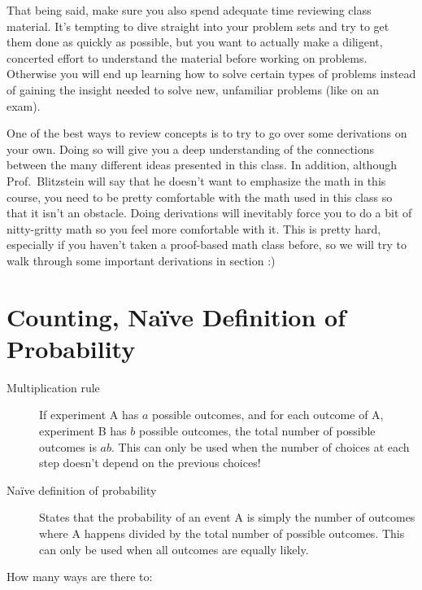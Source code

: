 \documentclass{article}
\begin{document}
That being said, make sure you also spend adequate time reviewing class material. It's tempting to dive straight into your problem sets and try to get them done as quickly as possible, but you want to actually make a diligent, concerted effort to understand the material before working on problems. Otherwise you will end up learning how to solve certain types of problems instead of gaining the insight needed to solve new, unfamiliar problems (like on an exam).

One of the best ways to review concepts is to try to go over some derivations on your own. Doing so will give you a deep understanding of the connections between the many different ideas presented in this class. In addition, although Prof.~Blitzstein will say that he doesn't want to emphasize the math in this course, you need to be pretty comfortable with the math used in this class so that it isn't an obstacle. Doing derivations will inevitably force you to do a bit of nitty-gritty math so you feel more comfortable with it. This is pretty hard, especially if you haven't taken a proof-based math class before, so we will try to walk through some important derivations in section :)

\section{Counting, Na\"{i}ve Definition of Probability}

\begin{description}

\item[Multiplication rule] If experiment A has $a$ possible outcomes, and for each outcome of A, experiment B has $b$ possible outcomes, the total number of possible outcomes is $ab$. This can only be used when the number of choices at each step doesn't depend on the previous choices!

\item[Na\"{i}ve definition of probability] States that the probability of an event A is simply the number of outcomes where A happens divided by the total number of possible outcomes. This can only be used when all outcomes are equally likely.

\end{description}

How many ways are there to:
\end{document}
